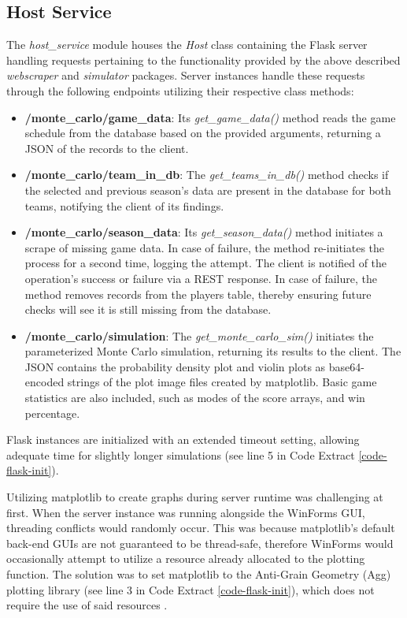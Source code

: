 \documentclass{thesis-ekf}
\theoremstyle{definition}
\theoremstyle{remark}
\begin{document}
\subsection{Host Service}
The \emph{host\_service} module houses the \emph{Host} class containing the Flask server handling requests pertaining to the functionality provided by the above described \emph{webscraper} and \emph{simulator} packages. Server instances handle these requests through the following endpoints utilizing their respective class methods:
\begin{itemize}
	\item \textbf{/monte\_carlo/game\_data}: Its \emph{get\_game\_data()} method reads the game schedule from the database based on the provided arguments, returning a JSON of the records to the client.
	
	\item \textbf{/monte\_carlo/team\_in\_db}: The \emph{get\_teams\_in\_db()} method checks if the selected and previous season's data are present in the database for both teams, notifying the client of its findings.
	
	\item \textbf{/monte\_carlo/season\_data}: Its \emph{get\_season\_data()} method initiates a scrape of missing game data. In case of failure, the method re-initiates the process for a second time, logging the attempt. The client is notified of the operation's success or failure via a REST response. In case of failure, the method removes records from the players table, thereby ensuring future checks will see it is still missing from the database.
	
	\item \textbf{/monte\_carlo/simulation}: The \emph{get\_monte\_carlo\_sim()} initiates the parameterized Monte Carlo simulation, returning its results to the client. The JSON contains the probability density plot and violin plots as base64-encoded strings of the plot image files created by matplotlib. Basic game statistics are also included, such as modes of the score arrays, and win percentage. 
\end{itemize}

Flask instances are initialized with an extended timeout setting, allowing adequate time for slightly longer simulations (see line 5 in Code Extract \ref{code-flask-init}). 

Utilizing matplotlib to create graphs during server runtime was challenging at first. When the server instance was running alongside the WinForms GUI, threading conflicts would randomly occur. This was because matplotlib's default back-end GUIs are not guaranteed to be thread-safe, therefore WinForms would occasionally attempt to utilize a resource already allocated to the plotting function. The solution was to set matplotlib to the Anti-Grain Geometry (Agg) plotting library (see line 3 in Code Extract \ref{code-flask-init}), which does not require the use of said resources \cite{agg}.
\end{document}

